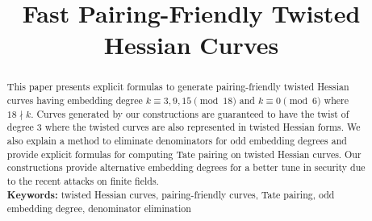\documentclass[11pt, a4paper]{article}
\theoremstyle{definition}
\newif\ifpublic
\begin{document}
\title{Fast Pairing-Friendly Twisted Hessian Curves}

\ifpublic
\author{Chitchanok Chuengsatiansup}

\institute{
Department of Mathematics and Computer Science\\
Technische Universiteit Eindhoven\\
P.O. Box 513, 5600 MB Eindhoven, The Netherlands\\
\email{c.chuengsatiansup@tue.nl}
}
\fi
\date{}
\maketitle
\begin{abstract}
This paper presents explicit formulas to generate pairing-friendly twisted Hessian curves
having embedding degree $k \equiv 3,9,15 \pmod{18}$ and $k \equiv 0 \pmod{6}$ where $18 \nmid k$.
Curves generated by our constructions are guaranteed to have the twist of degree 3
where the twisted curves are also represented in twisted Hessian forms.
We also explain a method to eliminate denominators for odd embedding degrees
and provide explicit formulas for computing Tate pairing on twisted Hessian curves.
Our constructions provide alternative embedding degrees for a better tune in security
due to the recent attacks on finite fields.
\\[10pt]
\textbf{Keywords:}
twisted Hessian curves, pairing-friendly curves, Tate pairing, odd embedding degree, denominator elimination
\end{abstract}








%




\end{document}
